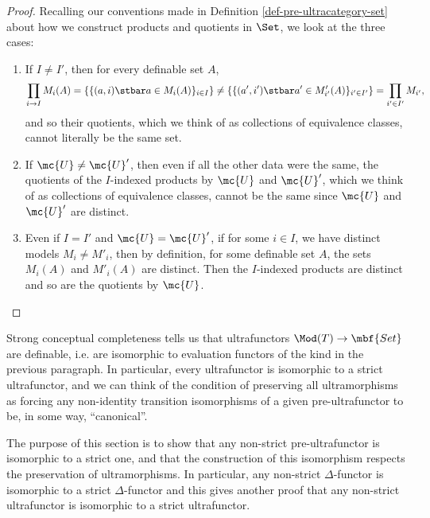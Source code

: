   \begin{proof}
    Recalling our conventions made in Definition \ref{def-pre-ultracategory-set} about how we construct products and quotients in $\Set$, we look at the three cases:
    \begin{enumerate}
    \item If $I \neq I'$, then for every definable set $A$, $$\prod_{i \to I} M_i(A) = \left\{\{(a, i) \stbar a \in M_i(A)\}_{i \in I}\right\} \neq \left\{\{(a', i') \stbar a' \in M'_{i'}(A)\}_{i' \in I'}\right\} = \prod_{i' \in I'} M_{i'},$$ and so their quotients, which we think of as collections of equivalence classes, cannot literally be the same set.
    \item If $\mc{U} \neq \mc{U}'$, then even if all the other data were the same, the quotients of the $I$-indexed products by $\mc{U}$ and $\mc{U}'$, which we think of as collections of equivalence classes, cannot be the same since $\mc{U}$ and $\mc{U}'$ are distinct.
    \item Even if $I = I'$ and $\mc{U} = \mc{U}'$, if for some $i \in I$, we have distinct models $M_i \neq M'_i$, then by definition, for some definable set $A$, the sets $M_i(A)$ and $M'_i(A)$ are distinct. Then the $I$-indexed products are distinct and so are the quotients by $\mc{U}$.
      \end{enumerate}
    \end{proof}

  Strong conceptual completeness \cite{makkai-sdfol} tells us that ultrafunctors $\Mod(T) \to \mbf{Set}$ are definable, i.e. are isomorphic to evaluation functors of the kind in the previous paragraph. In particular, every ultrafunctor is isomorphic to a strict ultrafunctor, and we can think of the condition of preserving all ultramorphisms as forcing any non-identity transition isomorphisms of a given pre-ultrafunctor to be, in some way, ``canonical''.

The purpose of this section is to show that any non-strict pre-ultrafunctor is isomorphic to a strict one, and that the construction of this isomorphism respects the preservation of ultramorphisms. In particular, any non-strict $\Delta$-functor is isomorphic to a strict $\Delta$-functor and this gives another proof that any non-strict ultrafunctor is isomorphic to a strict ultrafunctor.

